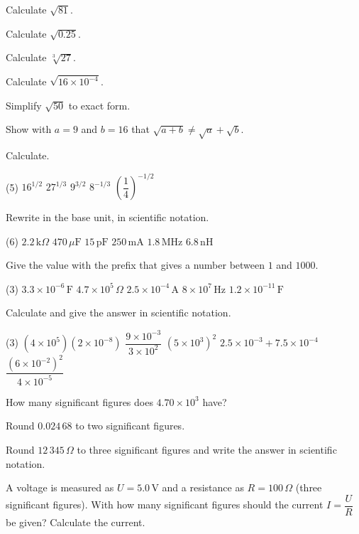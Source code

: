 \begin{parts}
  \item Calculate $\sqrt{81}$.
  \item Calculate $\sqrt{0.25}$.
  \item Calculate $\sqrt[3]{27}$.
  \item Calculate $\sqrt{16 \times 10^{-4}}$.
  \item Simplify $\sqrt{50}$ to exact form.
  \item Show with $a = 9$ and $b = 16$ that $\sqrt{a + b} \neq \sqrt{a} + \sqrt{b}$.
\end{parts}

Calculate.
\begin{delar}(5)
  \task $16^{1/2}$
  \task $27^{1/3}$
  \task $9^{3/2}$
  \task $8^{-1/3}$
  \task $\left(\dfrac{1}{4}\right)^{-1/2}$
\end{delar}

Rewrite in the base unit, in scientific notation.
\begin{delar}(6)
  \task $2.2\,\text{k}\Omega$
  \task $470\,\mu\text{F}$
  \task $15\,\text{pF}$
  \task $250\,\text{mA}$
  \task $1.8\,\text{MHz}$
  \task $6.8\,\text{nH}$
\end{delar}

Give the value with the prefix that gives a number between $1$ and $1000$.
\begin{delar}(3)
  \task $3.3 \times 10^{-6}\,\text{F}$
  \task $4.7 \times 10^{5}\,\Omega$
  \task $2.5 \times 10^{-4}\,\text{A}$
  \task $8 \times 10^{7}\,\text{Hz}$
  \task $1.2 \times 10^{-11}\,\text{F}$
\end{delar}

Calculate and give the answer in scientific notation.
\begin{delar}(3)
  \task $\left(4 \times 10^5\right)\left(2 \times 10^{-8}\right)$
  \task $\dfrac{9 \times 10^{-3}}{3 \times 10^{2}}$
  \task $\left(5 \times 10^3\right)^2$
  \task $2.5 \times 10^{-3} + 7.5 \times 10^{-4}$
  \task $\dfrac{\left(6 \times 10^{-2}\right)^2}{4 \times 10^{-5}}$
\end{delar}

\begin{parts}
  \item How many significant figures does $4.70 \times 10^3$ have?
  \item Round $0.024\,68$ to two significant figures.
  \item Round $12\,345\,\Omega$ to three significant figures and write the answer in scientific
    notation.
  \item A voltage is measured as $U = 5.0\,\text{V}$ and a resistance as $R = 100\,\Omega$ (three
    significant figures). With how many significant figures should the current
    $I = \dfrac{U}{R}$ be given? Calculate the current.
\end{parts}

